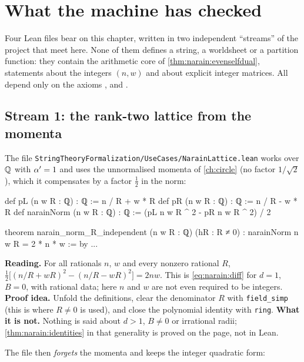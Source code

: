 \section{What the machine has checked}\label{sec:narain:lean}

Four Lean files bear on this chapter, written in two independent ``streams'' of the project
that meet here. None of them defines a string, a worldsheet or a partition function: they
contain the arithmetic core of \cref{thm:narain:evenselfdual}, statements about the integers
$(n,w)$ and about explicit integer matrices. All depend only on the axioms ,
 and .

\subsection{Stream 1: the rank-two lattice from the momenta}

The file \texttt{StringTheoryFormalization/UseCases/NarainLattice.lean} works over $\mathbb{Q}$ with
$\alpha'=1$ and uses the unnormalised momenta of \cref{ch:circle} (no factor $1/\sqrt2$), which
it compensates by a factor $\frac12$ in the norm:

\begin{leancode}
def pL (n w R : ℚ) : ℚ := n / R + w * R
def pR (n w R : ℚ) : ℚ := n / R - w * R
def narainNorm (n w R : ℚ) : ℚ := (pL n w R ^ 2 - pR n w R ^ 2) / 2

theorem narain_norm_R_independent (n w R : ℚ) (hR : R ≠ 0) :
    narainNorm n w R = 2 * n * w := by ...
\end{leancode}

\begin{leanbox}
\textbf{Reading.} For all rationals $n$, $w$ and every nonzero rational $R$,
$\frac12\big[(n/R+wR)^2-(n/R-wR)^2\big]=2nw$. This is \eqref{eq:narain:diff} for $d=1$,
$B=0$, with rational data; here $n$ and $w$ are not even required to be integers.
\textbf{Proof idea.} Unfold the definitions, clear the denominator $R$ with
\texttt{field\_simp} (this is where $R\neq0$ is used), and close the polynomial identity with
\texttt{ring}. \textbf{What it is not.} Nothing is said about $d>1$, $B\neq0$ or irrational radii;
\cref{thm:narain:identities} in that generality is proved on the page, not in Lean.
\end{leanbox}

The file then \emph{forgets} the momenta and keeps the integer quadratic form:


